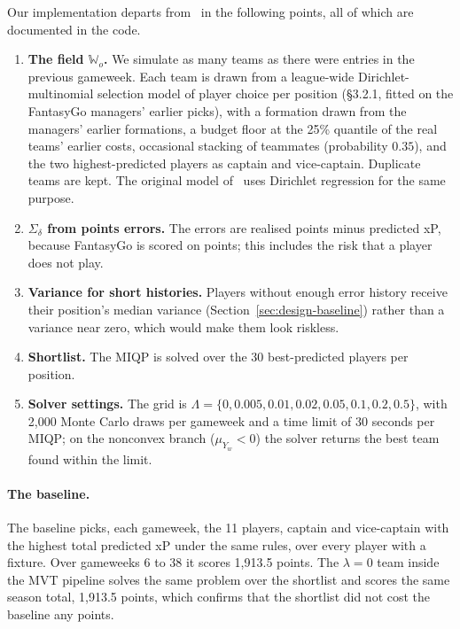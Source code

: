 Our implementation departs from~\cite{haugh2021} in the following points, all of which are
documented in the code.
\begin{enumerate}
  \item \textbf{The field $\mathbb{W}_o$.} We simulate as many teams as there were entries in the
        previous gameweek. Each team is drawn from a league-wide Dirichlet-multinomial selection
        model of player choice per position (§3.2.1, fitted on the FantasyGo managers' earlier
        picks), with a formation drawn from the managers' earlier formations, a budget floor
        at the 25\% quantile of the real teams' earlier costs, occasional stacking of teammates
        (probability $0.35$), and the two highest-predicted players as captain and vice-captain.
        Duplicate teams are kept. The original model of~\cite{haugh2021} uses Dirichlet
        regression for the same purpose.
  \item \textbf{$\Sigma_\delta$ from points errors.} The errors are realised points minus
        predicted xP, because FantasyGo is scored on points; this includes the risk that a player
        does not play.
  \item \textbf{Variance for short histories.} Players without enough error history receive
        their position's median variance (Section~\ref{sec:design-baseline}) rather than a
        variance near zero, which would make them look riskless.
  \item \textbf{Shortlist.} The MIQP is solved over the 30 best-predicted players per position.
  \item \textbf{Solver settings.} The grid is
        $\Lambda=\{0, 0.005, 0.01, 0.02, 0.05, 0.1, 0.2, 0.5\}$, with 2{,}000 Monte Carlo
        draws per gameweek and a time limit of 30 seconds per MIQP; on the nonconvex branch
        ($\mu_{Y_w}<0$) the solver returns the best team found within the limit.
\end{enumerate}

\paragraph{The baseline.} The baseline picks, each gameweek, the 11 players, captain and
vice-captain with the highest total predicted xP under the same rules, over every player with a
fixture. Over gameweeks 6 to 38 it scores 1{,}913.5 points. The $\lambda=0$ team inside the MVT
pipeline solves the same problem over the shortlist and scores the same season total, 1{,}913.5
points, which confirms that the shortlist did not cost the baseline any points.


